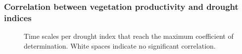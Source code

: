 \documentclass[
  authoryear,
  preprint,
  3p,
  onecolumn]{elsarticle}
\begin{document}
\subsubsection{Correlation between vegetation productivity and drought
indices}\label{correlation-between-vegetation-productivity-and-drought-indices}

\begin{figure}[!ht]


\caption{\label{fig-corTimeScale}Time scales per drought index that
reach the maximum coefficient of determination. White spaces indicate no
significant correlation.}

\end{figure}%
\end{document}
